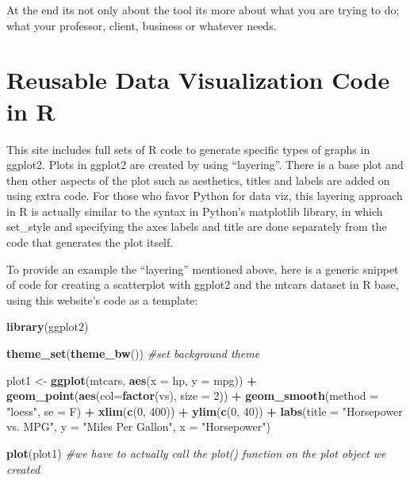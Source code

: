 \documentclass[]{book}
\newenvironment{Shaded}{\begin{snugshade}}{\end{snugshade}}
\newcommand{\KeywordTok}[1]{\textcolor[rgb]{0.13,0.29,0.53}{\textbf{#1}}}
\newcommand{\DataTypeTok}[1]{\textcolor[rgb]{0.13,0.29,0.53}{#1}}
\newcommand{\DecValTok}[1]{\textcolor[rgb]{0.00,0.00,0.81}{#1}}
\newcommand{\StringTok}[1]{\textcolor[rgb]{0.31,0.60,0.02}{#1}}
\newcommand{\CommentTok}[1]{\textcolor[rgb]{0.56,0.35,0.01}{\textit{#1}}}
\newcommand{\OperatorTok}[1]{\textcolor[rgb]{0.81,0.36,0.00}{\textbf{#1}}}
\newcommand{\NormalTok}[1]{#1}
\theoremstyle{definition}
\theoremstyle{definition}
\theoremstyle{definition}
\theoremstyle{remark}
\begin{document}
At the end its not only about the tool its more about what you are
trying to do; what your professor, client, business or whatever needs.

\section{Reusable Data Visualization Code in
R}\label{reusable-data-visualization-code-in-r}

\citep{viz_R}

This site includes full sets of R code to generate specific types of
graphs in ggplot2. Plots in ggplot2 are created by using ``layering''.
There is a base plot and then other aspects of the plot such as
aesthetics, titles and labels are added on using extra code. For those
who favor Python for data viz, this layering approach in R is actually
similar to the syntax in Python's matplotlib library, in which
set\_style and specifying the axes labels and title are done separately
from the code that generates the plot itself.

To provide an example the ``layering'' mentioned above, here is a
generic snippet of code for creating a scatterplot with ggplot2 and the
mtcars dataset in R base, using this website's code as a template:

\begin{Shaded}
\begin{Highlighting}[]
\KeywordTok{library}\NormalTok{(ggplot2)}

\KeywordTok{theme_set}\NormalTok{(}\KeywordTok{theme_bw}\NormalTok{())  }\CommentTok{#set background theme}

\NormalTok{plot1 <-}\StringTok{ }\KeywordTok{ggplot}\NormalTok{(mtcars, }\KeywordTok{aes}\NormalTok{(}\DataTypeTok{x =}\NormalTok{ hp, }\DataTypeTok{y =}\NormalTok{ mpg)) }\OperatorTok{+}\StringTok{ }\KeywordTok{geom_point}\NormalTok{(}\KeywordTok{aes}\NormalTok{(}\DataTypeTok{col=}\KeywordTok{factor}\NormalTok{(vs), }\DataTypeTok{size =} \DecValTok{2}\NormalTok{)) }\OperatorTok{+}\StringTok{ }\KeywordTok{geom_smooth}\NormalTok{(}\DataTypeTok{method =} \StringTok{"loess"}\NormalTok{, }\DataTypeTok{se =}\NormalTok{ F) }\OperatorTok{+}\StringTok{ }\KeywordTok{xlim}\NormalTok{(}\KeywordTok{c}\NormalTok{(}\DecValTok{0}\NormalTok{, }\DecValTok{400}\NormalTok{)) }\OperatorTok{+}\StringTok{ }\KeywordTok{ylim}\NormalTok{(}\KeywordTok{c}\NormalTok{(}\DecValTok{0}\NormalTok{, }\DecValTok{40}\NormalTok{)) }\OperatorTok{+}\StringTok{ }\KeywordTok{labs}\NormalTok{(}\DataTypeTok{title =} \StringTok{"Horsepower vs. MPG"}\NormalTok{, }\DataTypeTok{y =} \StringTok{"Miles Per Gallon"}\NormalTok{, }\DataTypeTok{x =} \StringTok{"Horsepower"}\NormalTok{)}

\KeywordTok{plot}\NormalTok{(plot1)  }\CommentTok{#we have to actually call the plot() function on the plot object we created}
\end{Highlighting}
\end{Shaded}
\end{document}
